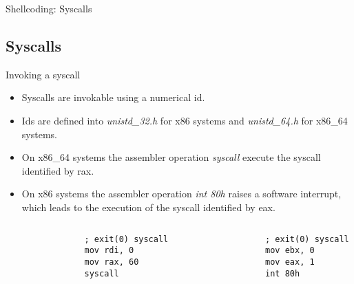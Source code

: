 \begin{frame}[fragile]{Shellcoding: Syscalls}
	\subsection{Syscalls}
	\begin{block}{Invoking a syscall}
		\begin{itemize}
			\item Syscalls are invokable using a numerical id.
			\item Ids are defined into \emph{unistd\_32.h} for x86 systems and \emph{unistd\_64.h} for x86\_64 systems.
			\item On x86\_64 systems the assembler operation \emph{syscall} execute the syscall identified by rax.
			\item On x86 systems the assembler operation \emph{int 80h} raises a software interrupt, which leads to the execution
				of the syscall identified by eax.
		\end{itemize}
	\end{block}
	\acode
	\begin{columns}[T]
		\begin{column}{.4\textwidth}
			\begin{lstlisting}
				; exit(0) syscall
				mov rdi, 0
				mov rax, 60
				syscall
			\end{lstlisting}
		\end{column}
		\begin{column}{.4\textwidth}
			\begin{lstlisting}
				; exit(0) syscall
				mov ebx, 0
				mov eax, 1
				int 80h
			\end{lstlisting}
		\end{column}
	\end{columns}
\end{frame}

